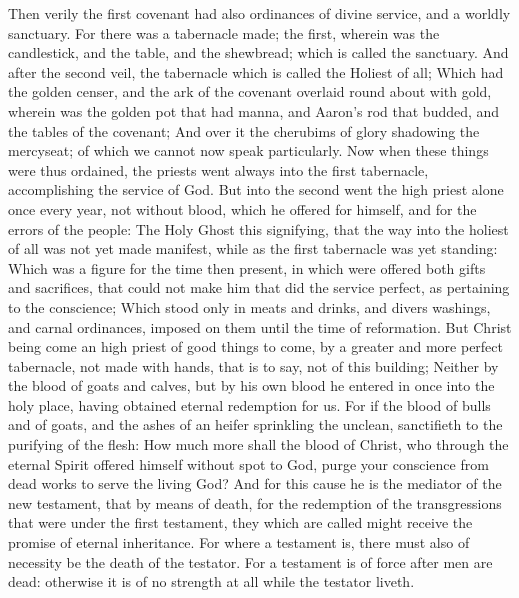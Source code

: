  Then verily the first covenant had also ordinances of
divine service, and a worldly sanctuary.  For there was a
tabernacle made; the first, wherein was the candlestick, and the table,
and the shewbread; which is called the sanctuary.  And
after the second veil, the tabernacle which is called the Holiest of
all;  Which had the golden censer, and the ark of the
covenant overlaid round about with gold, wherein was the golden pot that
had manna, and Aaron's rod that budded, and the tables of the covenant;
 And over it the cherubims of glory shadowing the
mercyseat; of which we cannot now speak particularly.  Now
when these things were thus ordained, the priests went always into the
first tabernacle, accomplishing the service of God.  But
into the second went the high priest alone once every year, not without
blood, which he offered for himself, and for the errors of the people:
 The Holy Ghost this signifying, that the way into the
holiest of all was not yet made manifest, while as the first tabernacle
was yet standing:  Which was a figure for the time then
present, in which were offered both gifts and sacrifices, that could not
make him that did the service perfect, as pertaining to the conscience;
 Which stood only in meats and drinks, and divers
washings, and carnal ordinances, imposed on them until the time of
reformation.  But Christ being come an high priest of
good things to come, by a greater and more perfect tabernacle, not made
with hands, that is to say, not of this building; 
Neither by the blood of goats and calves, but by his own blood he
entered in once into the holy place, having obtained eternal redemption
for us.  For if the blood of bulls and of goats, and the
ashes of an heifer sprinkling the unclean, sanctifieth to the purifying
of the flesh:  How much more shall the blood of Christ,
who through the eternal Spirit offered himself without spot to God,
purge your conscience from dead works to serve the living God?
 And for this cause he is the mediator of the new
testament, that by means of death, for the redemption of the
transgressions that were under the first testament, they which are
called might receive the promise of eternal inheritance. 
For where a testament is, there must also of necessity be the death of
the testator.  For a testament is of force after men are
dead: otherwise it is of no strength at all while the testator liveth.
